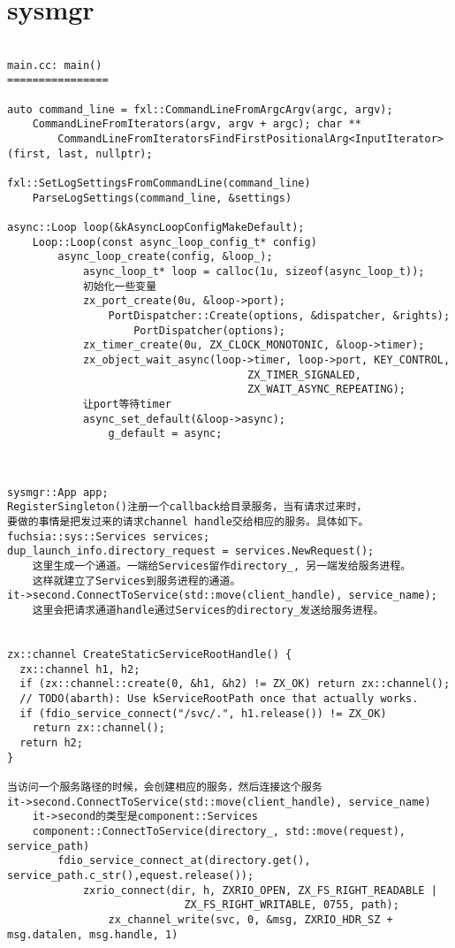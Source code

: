 \section{sysmgr}

\begin{verbatim}

main.cc: main()
================

auto command_line = fxl::CommandLineFromArgcArgv(argc, argv);
    CommandLineFromIterators(argv, argv + argc); char **
        CommandLineFromIteratorsFindFirstPositionalArg<InputIterator>(first, last, nullptr);

fxl::SetLogSettingsFromCommandLine(command_line)
    ParseLogSettings(command_line, &settings)

async::Loop loop(&kAsyncLoopConfigMakeDefault);
    Loop::Loop(const async_loop_config_t* config)
        async_loop_create(config, &loop_);
            async_loop_t* loop = calloc(1u, sizeof(async_loop_t));
            初始化一些变量
            zx_port_create(0u, &loop->port);
                PortDispatcher::Create(options, &dispatcher, &rights);
                    PortDispatcher(options);
            zx_timer_create(0u, ZX_CLOCK_MONOTONIC, &loop->timer);     
            zx_object_wait_async(loop->timer, loop->port, KEY_CONTROL,
                                      ZX_TIMER_SIGNALED,
                                      ZX_WAIT_ASYNC_REPEATING);
            让port等待timer
            async_set_default(&loop->async);
                g_default = async;



sysmgr::App app;
RegisterSingleton()注册一个callback给目录服务，当有请求过来时，
要做的事情是把发过来的请求channel handle交给相应的服务。具体如下。
fuchsia::sys::Services services;
dup_launch_info.directory_request = services.NewRequest();
    这里生成一个通道。一端给Services留作directory_, 另一端发给服务进程。
    这样就建立了Services到服务进程的通道。
it->second.ConnectToService(std::move(client_handle), service_name);
    这里会把请求通道handle通过Services的directory_发送给服务进程。


zx::channel CreateStaticServiceRootHandle() {
  zx::channel h1, h2;
  if (zx::channel::create(0, &h1, &h2) != ZX_OK) return zx::channel();
  // TODO(abarth): Use kServiceRootPath once that actually works.
  if (fdio_service_connect("/svc/.", h1.release()) != ZX_OK)
    return zx::channel();
  return h2;
}

当访问一个服务路径的时候，会创建相应的服务，然后连接这个服务
it->second.ConnectToService(std::move(client_handle), service_name)
    it->second的类型是component::Services
    component::ConnectToService(directory_, std::move(request), service_path)
        fdio_service_connect_at(directory.get(), service_path.c_str(),equest.release());
            zxrio_connect(dir, h, ZXRIO_OPEN, ZX_FS_RIGHT_READABLE |
                            ZX_FS_RIGHT_WRITABLE, 0755, path);
                zx_channel_write(svc, 0, &msg, ZXRIO_HDR_SZ + msg.datalen, msg.handle, 1)


\end{verbatim}
